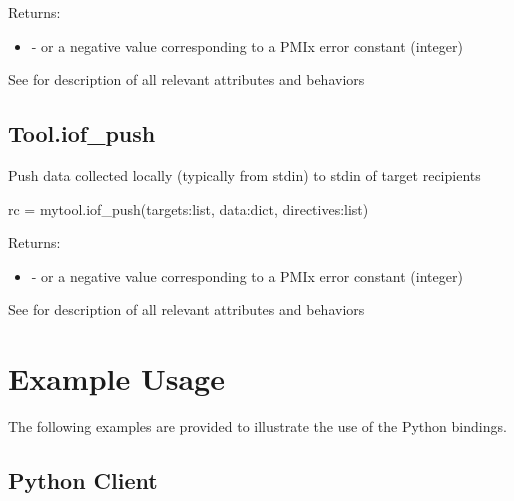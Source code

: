 Returns:

\begin{itemize}
    \item {} -  or a negative value corresponding to a PMIx error constant (integer)
\end{itemize}


See  for description of all relevant attributes and behaviors


\subsection{Tool.iof_push}

\summary

Push data collected locally (typically from stdin) to
stdin of target recipients

\format

\pyspecificstart
\begin{codepar}
rc = mytool.iof_push(targets:list, data:dict, directives:list)
\end{codepar}
\pyspecificend

\begin{arglist}
\end{arglist}

Returns:

\begin{itemize}
    \item {} -  or a negative value corresponding to a PMIx error constant (integer)
\end{itemize}


See  for description of all relevant attributes and behaviors


\section{Example Usage}
\label{app:python:examples}

The following examples are provided to illustrate the use of the Python bindings.

\subsection{Python Client}

